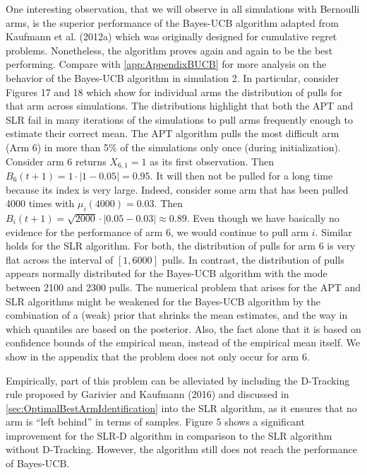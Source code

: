 \documentclass[11pt,]{article}
\begin{document}
One interesting observation, that we will observe in all simulations
with Bernoulli arms, is the superior performance of the Bayes-UCB
algorithm adapted from Kaufmann et al. (2012a) which was originally
designed for cumulative regret problems. Nonetheless, the algorithm
proves again and again to be the best performing. Compare with
\autoref{app:AppendixBUCB} for more analysis on the behavior of the
Bayes-UCB algorithm in simulation 2. In particular, consider Figures 17
and 18 which show for individual arms the distribution of pulls for that
arm across simulations. The distributions highlight that both the APT
and SLR fail in many iterations of the simulations to pull arms
frequently enough to estimate their correct mean. The APT algorithm
pulls the most difficult arm (Arm 6) in more than 5\% of the simulations
only once (during initialization). Consider arm 6 returns
\(X_{6,1} = 1\) as its first observation. Then
\(B_6(t+1) = 1 \cdot |1-0.05| = 0.95\). It will then not be pulled for a
long time because its index is very large. Indeed, consider some arm
that has been pulled 4000 times with \(\mu_i(4000) = 0.03\). Then
\(B_i(t+1) = \sqrt{2000} \cdot |0.05-0.03| \approx 0.89\). Even though
we have basically no evidence for the performance of arm \(6\), we would
continue to pull arm \(i\). Similar holds for the SLR algorithm. For
both, the distribution of pulls for arm 6 is very flat across the
interval of \([1,6000]\) pulls. In contrast, the distribution of pulls
appears normally distributed for the Bayes-UCB algorithm with the mode
between 2100 and 2300 pulls. The numerical problem that arises for the
APT and SLR algorithms might be weakened for the Bayes-UCB algorithm by
the combination of a (weak) prior that shrinks the mean estimates, and
the way in which quantiles are based on the posterior. Also, the fact
alone that it is based on confidence bounds of the empirical mean,
instead of the empirical mean itself. We show in the appendix that the
problem does not only occur for arm 6.

Empirically, part of this problem can be alleviated by including the
D-Tracking rule proposed by Garivier and Kaufmann (2016) and discussed
in \autoref{sec:OptimalBestArmIdentification} into the SLR algorithm, as
it ensures that no arm is ``left behind'' in terms of samples. Figure 5
shows a significant improvement for the SLR-D algorithm in comparison to
the SLR algorithm without D-Tracking. However, the algorithm still does
not reach the performance of Bayes-UCB.
\end{document}
